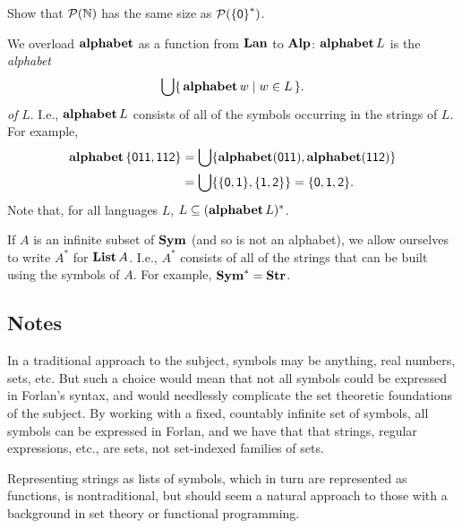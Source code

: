 \begin{exercise}
Show that ${\cal P} (\mathbb{N})$ has the same size as  ${\cal P} (\mathsf{\{0\}}^*)$.
\end{exercise}

We overload $\mathbf{alphabet}$ as a function from $\mathbf{Lan}$ to $\mathbf{Alp}$:
$\mathbf{alphabet}\,L$ is
%
%
the \emph{alphabet}
%
%
\begin{gather*}
\bigcup\{ \, \mathbf{alphabet}\,w \mid w\in L \, \} .
\end{gather*}
\emph{of} $L$.
I.e., $\mathbf{alphabet}\,L$ consists of all of the symbols occurring in the
strings of $L$.
For example,
\begin{align*}
\mathbf{alphabet}\,\mathsf{\{011,112\}} &=
\bigcup\{\mathbf{alphabet}(\mathsf{011}),\mathbf{alphabet}(\mathsf{112})\} \\
&= \bigcup\{\{\mathsf{0},\mathsf{1}\},\{\mathsf{1},\mathsf{2}\}\}
= \{\mathsf{0},\mathsf{1},\mathsf{2}\} .
\end{align*}
Note that, for all languages $L$, $L\subseteq(\mathbf{alphabet}\,L)^*$.

If $A$ is an infinite subset of $\mathbf{Sym}$ (and so is not an alphabet), we
allow ourselves to write $A^*$
%
for $\mathbf{List}\,A$.
I.e., $A^*$ consists of all of the strings that can be built using the
symbols of $A$.  For example, $\mathbf{Sym}^* = \mathbf{Str}$.
%
%
%

\subsection{Notes}

In a traditional approach to the subject, symbols may be anything,
real numbers, sets, etc.  But such a choice would mean that not all
symbols could be expressed in Forlan's syntax, and would needlessly
complicate the set theoretic foundations of the subject.  By working
with a fixed, countably infinite set of symbols, all symbols can be
expressed in Forlan, and we have that that strings, regular
expressions, etc., are sets, not set-indexed families of sets.

Representing strings as lists of symbols, which in turn are
represented as functions, is nontraditional, but should seem a natural
approach to those with a background in set theory or functional
programming.

